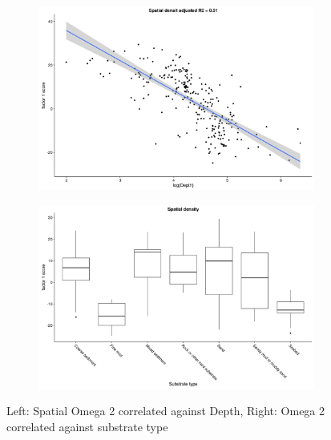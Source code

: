 \documentclass{article}
\begin{document}
\begin{figure}[!ht]
	\label{fig:S2}
	
\begin{subfigure}{0.5\textwidth}
	\includegraphics[width = \linewidth]{"figures/Factor1_DepthO2"}
\end{subfigure}
\begin{subfigure}{0.5\textwidth}
	\includegraphics[width = \linewidth]{"figures/Factor1_HabitatO2"}
\end{subfigure}
\caption{Left: Spatial Omega 2 correlated against Depth, Right: Omega 2
	correlated against substrate type}

\end{figure}
\end{document}
